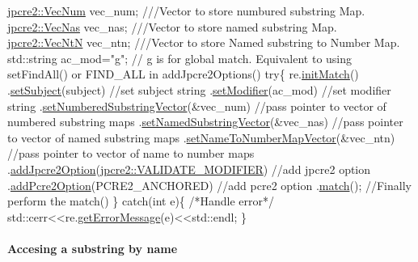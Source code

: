 \begin{DoxyCode}
\hyperlink{namespacejpcre2_ac1cf752c8fbb0be78020be3b80e77ce3}{jpcre2::VecNum} vec\_num;   \textcolor{comment}{///Vector to store numbured substring Map.}
\textcolor{comment}{}\hyperlink{namespacejpcre2_a2b121ae776ea5b2913839f418a7d856b}{jpcre2::VecNas} vec\_nas;   \textcolor{comment}{///Vector to store named substring Map.}
\textcolor{comment}{}\hyperlink{namespacejpcre2_a88a7aaf84cad627d34c8152e726168eb}{jpcre2::VecNtN} vec\_ntn;   \textcolor{comment}{///Vector to store Named substring to Number Map.}
\textcolor{comment}{}std::string ac\_mod=\textcolor{stringliteral}{"g"};   \textcolor{comment}{// g is for global match. Equivalent to using setFindAll() or FIND\_ALL in
       addJpcre2Options()}
\textcolor{keywordflow}{try}\{
    re.\hyperlink{classjpcre2_1_1Regex_a519b0915bf1163c6ce6a4d674b30cfcd}{initMatch}()
      .\hyperlink{classjpcre2_1_1RegexMatch_a635c652195deaa8ebb9e107c4f972aab}{setSubject}(subject)                         \textcolor{comment}{//set subject string}
      .\hyperlink{classjpcre2_1_1RegexMatch_a9df7e92f96b61553f62720cb8f5f23e5}{setModifier}(ac\_mod)                         \textcolor{comment}{//set modifier string}
      .\hyperlink{classjpcre2_1_1RegexMatch_a2c7efe1ec2e13827f670db4ecedcd0a0}{setNumberedSubstringVector}(&vec\_num)        \textcolor{comment}{//pass pointer to vector of
       numbered substring maps}
      .\hyperlink{classjpcre2_1_1RegexMatch_ae495431f57cae54363331237ab21b56c}{setNamedSubstringVector}(&vec\_nas)           \textcolor{comment}{//pass pointer to vector of named
       substring maps}
      .\hyperlink{classjpcre2_1_1RegexMatch_a04926e61d8b5f1d8bdf344efecd567d8}{setNameToNumberMapVector}(&vec\_ntn)          \textcolor{comment}{//pass pointer to vector of name
       to number maps}
      .\hyperlink{classjpcre2_1_1RegexMatch_a0a4cf8554a7e00f3cf2db34f60a43f60}{addJpcre2Option}(\hyperlink{namespacejpcre2_a85c143271501e383843f45b9999c2f00a9124b768bcae4d51430aa7f26126f387}{jpcre2::VALIDATE\_MODIFIER})  \textcolor{comment}{//add jpcre2
       option}
      .\hyperlink{classjpcre2_1_1RegexMatch_aac4857cd8f5eae15b29b9afbe9023522}{addPcre2Option}(PCRE2\_ANCHORED)              \textcolor{comment}{//add pcre2 option}
      .\hyperlink{classjpcre2_1_1RegexMatch_a5868aef3a146594ea1ebef34d122bb33}{match}();                                    \textcolor{comment}{//Finally perform the match()}
\}
\textcolor{keywordflow}{catch}(\textcolor{keywordtype}{int} e)\{
    \textcolor{comment}{/*Handle error*/}
    std::cerr<<re.\hyperlink{classjpcre2_1_1Regex_a92b75c438ccff871205b2175a6141fd5}{getErrorMessage}(e)<<std::endl;
\}
\end{DoxyCode}
\hypertarget{index_access-substring-by-name}{}\paragraph{Accesing a substring by name}\label{index_access-substring-by-name}

